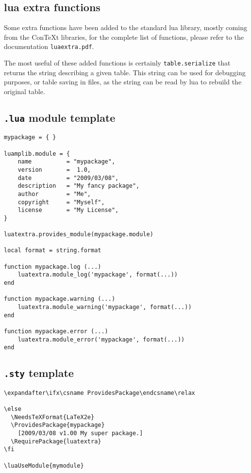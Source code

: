 \documentclass{article}
\begin{document}
\subsection{lua extra functions}

Some extra functions have been added to the standard lua library, mostly coming from the Con\TeX t libraries, for the complete list of functions, please refer to the documentation \texttt{luaextra.pdf}.

The most useful of these added functions is certainly \texttt{table.serialize} that returns the string describing a given table. This string can be used for debugging purposes, or table saving in files, as the string can be read by lua to rebuild the original table.

\subsection{\texttt{.lua} module template\label{sub:luatemplate}}

\begin{verbatim}
mypackage = { }

luamplib.module = {
    name          = "mypackage",
    version       =  1.0,
    date          = "2009/03/08",
    description   = "My fancy package",
    author        = "Me",
    copyright     = "Myself",
    license       = "My License",
}

luatextra.provides_module(mypackage.module)

local format = string.format

function mypackage.log (...)
    luatextra.module_log('mypackage', format(...))
end

function mypackage.warning (...)
    luatextra.module_warning('mypackage', format(...))
end

function mypackage.error (...)
    luatextra.module_error('mypackage', format(...))
end
\end{verbatim}

\subsection{\texttt{.sty} template}

\begin{verbatim}
\expandafter\ifx\csname ProvidesPackage\endcsname\relax
  
\else
  \NeedsTeXFormat{LaTeX2e}
  \ProvidesPackage{mypackage}
    [2009/03/08 v1.00 My super package.]
  \RequirePackage{luatextra}
\fi

\luaUseModule{mymodule}
\end{verbatim}
\end{document}
